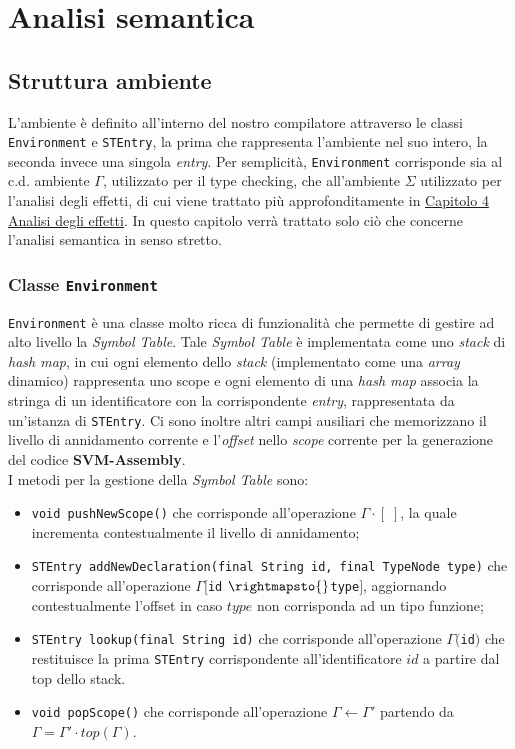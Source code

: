 \documentclass[../report.tex]{subfiles}
\begin{document}
\chapter{Analisi semantica}\label{c:analisi-semantica}
\section{Struttura ambiente}\label{s:struttura-ambiente}
L'ambiente è definito all'interno del nostro compilatore attraverso le classi \verb|Environment| e \verb|STEntry|, la prima che rappresenta l'ambiente nel suo intero, la seconda invece una singola \textit{entry}.
Per semplicità, \verb|Environment| corrisponde sia al c.d. ambiente $\Gamma{}$, utilizzato per il type checking, che all'ambiente $\Sigma{}$ utilizzato per l'analisi degli effetti, di cui viene trattato più approfonditamente in \hyperref[c:analisi-effetti]{Capitolo 4 Analisi degli effetti}. In questo capitolo verrà trattato solo ciò che concerne l'analisi semantica in senso stretto.

\subsection[Classe Environment]{Classe \texttt{Environment}}
\verb|Environment| è una classe molto ricca di funzionalità che permette di gestire ad alto livello la \textit{Symbol Table}. Tale \textit{Symbol Table} è implementata come uno \textit{stack} di \textit{hash map}, in cui ogni elemento dello \textit{stack} (implementato come una \textit{array} dinamico) rappresenta uno scope e ogni elemento di una \textit{hash map} associa la stringa di un identificatore con la corrispondente \textit{entry}, rappresentata da un'istanza di \verb|STEntry|.
Ci sono inoltre altri campi ausiliari che memorizzano il livello di annidamento corrente e l'\textit{offset} nello \textit{scope} corrente per la generazione del codice \textbf{SVM-Assembly}.\\
I metodi per la gestione della \textit{Symbol Table} sono:
\begin{itemize}
    \item \verb|void pushNewScope()| che corrisponde all'operazione $\Gamma{}\cdot{}[\;]$, la quale incrementa contestualmente il livello di annidamento;
    \item \verb|STEntry addNewDeclaration(final String id, final TypeNode type)| che corrisponde all'operazione $\Gamma{}[$\verb|id| $ \rightmapsto{}$\verb|type|$]$, aggiornando contestualmente l'offset in caso $type$ non corrisponda ad un tipo funzione;
    \item \verb|STEntry lookup(final String id)| che corrisponde all'operazione $\Gamma($\verb|id|$)$ che restituisce la prima \verb|STEntry| corrispondente all'identificatore $id$ a partire dal top dello stack.
    \item \verb|void popScope()| che corrisponde all'operazione $\Gamma \leftarrow{} \Gamma'$ partendo da $\Gamma = \Gamma'\cdot{}top(\Gamma)$.
\end{itemize}
\end{document}
